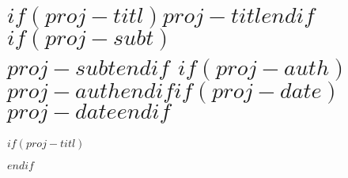 \part*{$if(proj-titl)$$proj-titl$$endif$$if(proj-subt)$\\ \bigskip\bigskip\bigskip\bigskip\bigskip\normalfont\Large{$proj-subt$}$endif$ $if(proj-auth)$\\ \bigskip\bigskip\bigskip\bigskip\bigskip\normalfont\large{$proj-auth$}$endif$$if(proj-date)$\\ \bigskip\normalfont\large{$proj-date$}$endif$}
$if(proj-titl)$$endif$
